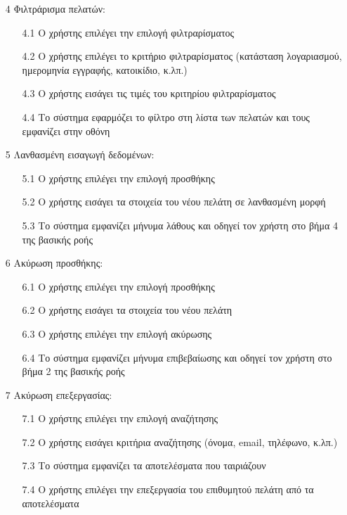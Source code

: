 \documentclass[12pt,a4paper,twoside]{book}
\begin{document}
\begin{enumerate}
  \item[4 ] Φιλτράρισμα πελατών:
        \begin{enumerate}
          \item [4.1 ] Ο χρήστης επιλέγει την επιλογή φιλτραρίσματος
          \item [4.2 ] Ο χρήστης επιλέγει το κριτήριο φιλτραρίσματος (κατάσταση λογαριασμού, ημερομηνία εγγραφής, κατοικίδιο, κ.λπ.)
          \item [4.3 ] Ο χρήστης εισάγει τις τιμές του κριτηρίου φιλτραρίσματος
          \item [4.4 ] Το σύστημα εφαρμόζει το φίλτρο στη λίστα των πελατών και τους εμφανίζει στην οθόνη
        \end{enumerate}
  \item[5 ] Λανθασμένη εισαγωγή δεδομένων:
        \begin{enumerate}
          \item [5.1 ] Ο χρήστης επιλέγει την επιλογή προσθήκης
          \item [5.2 ] Ο χρήστης εισάγει τα στοιχεία του νέου πελάτη σε λανθασμένη μορφή
          \item [5.3 ] Το σύστημα εμφανίζει μήνυμα λάθους και οδηγεί τον χρήστη στο βήμα 4 της βασικής ροής
        \end{enumerate}
  \item[6 ] Ακύρωση προσθήκης:
        \begin{enumerate}
          \item [6.1 ] Ο χρήστης επιλέγει την επιλογή προσθήκης
          \item [6.2 ] Ο χρήστης εισάγει τα στοιχεία του νέου πελάτη
          \item [6.3 ] Ο χρήστης επιλέγει την επιλογή ακύρωσης
          \item [6.4 ] Το σύστημα εμφανίζει μήνυμα επιβεβαίωσης και οδηγεί τον χρήστη στο βήμα 2 της βασικής ροής
        \end{enumerate}
  \item[7 ] Ακύρωση επεξεργασίας:
        \begin{enumerate}
          \item [7.1 ] Ο χρήστης επιλέγει την επιλογή αναζήτησης
          \item [7.2 ] Ο χρήστης εισάγει κριτήρια αναζήτησης (όνομα, email, τηλέφωνο, κ.λπ.)
          \item [7.3 ] Το σύστημα εμφανίζει τα αποτελέσματα που ταιριάζουν
          \item [7.4 ] Ο χρήστης επιλέγει την επεξεργασία του επιθυμητού πελάτη από τα αποτελέσματα

\end{enumerate}
\end{enumerate}
\end{document}
